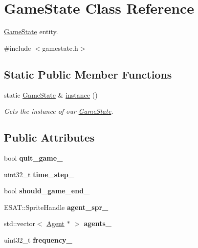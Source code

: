 \hypertarget{class_game_state}{}\section{Game\+State Class Reference}
\label{class_game_state}


\mbox{\hyperlink{class_game_state}{Game\+State}} entity.  




{\ttfamily \#include $<$gamestate.\+h$>$}

\subsection*{Static Public Member Functions}
\begin{DoxyCompactItemize}
\item 
static \mbox{\hyperlink{class_game_state}{Game\+State}} \& \mbox{\hyperlink{class_game_state_aaf43c32bcc232594c9e9939c4b55f692}{instance}} ()
\begin{DoxyCompactList}\small\item\em Gets the instance of our \mbox{\hyperlink{class_game_state}{Game\+State}}. \end{DoxyCompactList}\end{DoxyCompactItemize}
\subsection*{Public Attributes}
\begin{DoxyCompactItemize}
\item 
\mbox{\label{class_game_state_a17236a9e4ddb53287504198a88c97c59}} 
bool {\bfseries quit\+\_\+game\+\_\+}
\item 
\mbox{\label{class_game_state_ac9369dd597cc6276eb96f79c6ebc9ad9}} 
uint32\+\_\+t {\bfseries time\+\_\+step\+\_\+}
\item 
\mbox{\label{class_game_state_acc35df1f7209e70cbaf971c5128f80cf}} 
bool {\bfseries should\+\_\+game\+\_\+end\+\_\+}
\item 
\mbox{\label{class_game_state_a17003cbc828a82c99f9454253ca76660}} 
E\+S\+A\+T\+::\+Sprite\+Handle {\bfseries agent\+\_\+spr\+\_\+}
\item 
\mbox{\label{class_game_state_a25827355b9612be2b489fc41005ea507}} 
std\+::vector$<$ \mbox{\hyperlink{class_agent}{Agent}} $\ast$ $>$ {\bfseries agents\+\_\+}
\item 
\mbox{\label{class_game_state_afd22b13f977d8a6d7ff498c1a38b7845}} 
uint32\+\_\+t {\bfseries frequency\+\_\+}
\end{DoxyCompactItemize}


